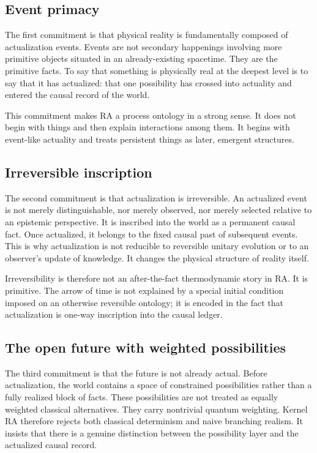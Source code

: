 \documentclass[11pt]{article}
\begin{document}
\subsection{Event primacy}
The first commitment is that physical reality is fundamentally composed of actualization events. Events are not secondary happenings involving more primitive objects situated in an already-existing spacetime. They are the primitive facts. To say that something is physically real at the deepest level is to say that it has actualized: that one possibility has crossed into actuality and entered the causal record of the world.

This commitment makes RA a process ontology in a strong sense. It does not begin with things and then explain interactions among them. It begins with event-like actuality and treats persistent things as later, emergent structures.

\subsection{Irreversible inscription}
The second commitment is that actualization is irreversible. An actualized event is not merely distinguishable, nor merely observed, nor merely selected relative to an epistemic perspective. It is inscribed into the world as a permanent causal fact. Once actualized, it belongs to the fixed causal past of subsequent events. This is why actualization is not reducible to reversible unitary evolution or to an observer's update of knowledge. It changes the physical structure of reality itself.

Irreversibility is therefore not an after-the-fact thermodynamic story in RA. It is primitive. The arrow of time is not explained by a special initial condition imposed on an otherwise reversible ontology; it is encoded in the fact that actualization is one-way inscription into the causal ledger.

\subsection{The open future with weighted possibilities}
The third commitment is that the future is not already actual. Before actualization, the world contains a space of constrained possibilities rather than a fully realized block of facts. These possibilities are not treated as equally weighted classical alternatives. They carry nontrivial quantum weighting. Kernel RA therefore rejects both classical determinism and naive branching realism. It insists that there is a genuine distinction between the possibility layer and the actualized causal record.
\end{document}
